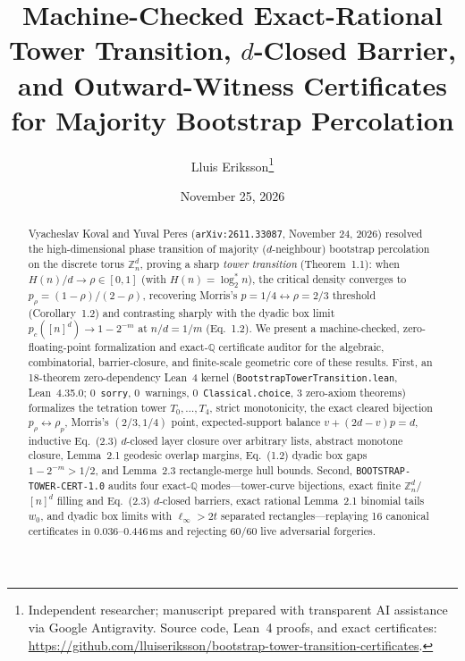 \documentclass[11pt,twocolumn]{article}
\title{\textbf{Machine-Checked Exact-Rational Tower Transition, $d$-Closed Barrier, and Outward-Witness Certificates for Majority Bootstrap Percolation}}
\author{Lluis Eriksson\thanks{Independent researcher; manuscript prepared with transparent AI assistance via Google Antigravity. Source code, Lean~4 proofs, and exact certificates: \url{https://github.com/lluiseriksson/bootstrap-tower-transition-certificates}.}}
\date{November 25, 2026}
\newcommand{\ZZ}{\mathbb{Z}}
\newcommand{\QQ}{\mathbb{Q}}
\begin{document}
\maketitle

\begin{abstract}
Vyacheslav Koval and Yuval Peres (\texttt{arXiv:2611.33087}, November 24, 2026) resolved the high-dimensional phase transition of majority ($d$-neighbour) bootstrap percolation on the discrete torus $\ZZ_n^d$, proving a sharp \emph{tower transition} (Theorem~1.1): when $H(n)/d \to \rho \in [0,1]$ (with $H(n)=\log_2^\ast n$), the critical density converges to $p_\rho = (1-\rho)/(2-\rho)$, recovering Morris's $p=1/4 \leftrightarrow \rho=2/3$ threshold (Corollary~1.2) and contrasting sharply with the dyadic box limit $p_c([n]^d) \to 1-2^{-m}$ at $n/d = 1/m$ (Eq.~1.2). We present a machine-checked, zero-floating-point formalization and exact-$\QQ$ certificate auditor for the algebraic, combinatorial, barrier-closure, and finite-scale geometric core of these results. First, an 18-theorem zero-dependency Lean~4 kernel (\texttt{BootstrapTowerTransition.lean}, Lean~4.35.0; 0~\texttt{sorry}, 0~warnings, 0~\texttt{Classical.choice}, 3 zero-axiom theorems) formalizes the tetration tower $T_0,\dots,T_4$, strict monotonicity, the exact cleared bijection $p_\rho \leftrightarrow \rho_p$, Morris's $(2/3,1/4)$ point, expected-support balance $v+(2d-v)p=d$, inductive Eq.~(2.3) $d$-closed layer closure over arbitrary lists, abstract monotone closure, Lemma~2.1 geodesic overlap margins, Eq.~(1.2) dyadic box gaps $1-2^{-m} > 1/2$, and Lemma~2.3 rectangle-merge hull bounds. Second, \texttt{BOOTSTRAP-TOWER-CERT-1.0} audits four exact-$\QQ$ modes—tower-curve bijections, exact finite $\ZZ_n^d$/$[n]^d$ filling and Eq.~(2.3) $d$-closed barriers, exact rational Lemma~2.1 binomial tails $w_0$, and dyadic box limits with $\ell_\infty > 2t$ separated rectangles—replaying 16 canonical certificates in $0.036$--$0.446\,\mathrm{ms}$ and rejecting 60/60 live adversarial forgeries.
\end{abstract}
\end{document}
